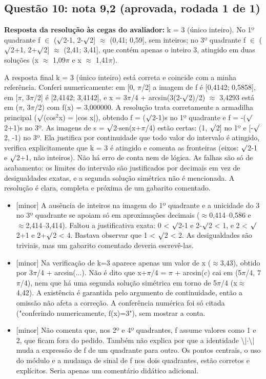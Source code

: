 \documentclass{article}%
\begin{document}
\subsection*{Questão 10: nota 9,2 (aprovada, rodada 1 de 1)}%
\textbf{Resposta da resolução às cegas do avaliador:} k = 3 (único inteiro). No 1º quadrante f $\in$ ($\surd$2-1, 2-$\surd$2{]} $\approx$ (0,41; 0,59{]}, sem inteiros; no 3º quadrante f $\in$ ($\surd$2+1, 2+$\surd$2{]} $\approx$ (2,41; 3,41{]}, que contém apenas o inteiro 3, atingido em duas soluções (x $\approx$ 1,09$\pi$ e x $\approx$ 1,41$\pi$).\par %
A resposta final k = 3 (único inteiro) está correta e coincide com a minha referência. Conferi numericamente: em {[}0, $\pi$/2{]} a imagem de f é {[}0,4142; 0,5858{]}, em {[}$\pi$, 3$\pi$/2{]} é {[}2,4142; 3,4142{]}, e x = 3$\pi$/4 + arcsin(3(2-$\surd$2)/2) $\approx$ 3,4293 está em ($\pi$, 3$\pi$/2) com f(x) = 3,000000. A resolução trata corretamente a armadilha principal ($\surd$(cos$^2$x) = |cos x|), obtendo f = ($\surd$2-1)s no 1º quadrante e f = -($\surd$2+1)s no 3º. As imagens de s = $\surd$2$\cdot$sen(x+$\pi$/4) estão certas: (1, $\surd$2{]} no 1º e {[}-$\surd$2, -1) no 3º. Ela justifica por continuidade que todo valor do intervalo é atingido, verifica explicitamente que k = 3 é atingido e comenta as fronteiras (eixos: $\surd$2-1 e $\surd$2+1, não inteiros). Não há erro de conta nem de lógica. As falhas são só de acabamento: os limites do intervalo são justificados por decimais em vez de desigualdades exatas, e a segunda solução simétrica não é mencionada. A resolução é clara, completa e próxima de um gabarito comentado.%
\begin{itemize}%
\item%
{[}minor{]} A ausência de inteiros na imagem do 1º quadrante e a unicidade do 3 no 3º quadrante se apoiam só em aproximações decimais ($\approx$0,414--0,586 e $\approx$2,414--3,414). Faltou a justificativa exata: 0 < $\surd$2-1 e 2-$\surd$2 < 1, e 2 < $\surd$2+1 e 2+$\surd$2 < 4. Bastava observar que 1 < $\surd$2 < 2. As desigualdades são triviais, mas um gabarito comentado deveria escrevê{-}las.%
\item%
{[}minor{]} Na verificação de k=3 aparece apenas um valor de x ($\approx$3,43), obtido por 3$\pi$/4 + arcsin(...). Não é dito que x+$\pi$/4 = $\pi$ + arcsin(c) cai em (5$\pi$/4, 7$\pi$/4), nem que há uma segunda solução simétrica em torno de 5$\pi$/4 (x$\approx$4,42). A existência é garantida pelo argumento de continuidade, então a omissão não afeta a correção. A conferência numérica foi só citada ("conferindo numericamente, f(x)=3"), sem mostrar a conta.%
\item%
{[}minor{]} Não comenta que, nos 2º e 4º quadrantes, f assume valores como 1 e 2, que ficam fora do pedido. Também não explica por que a identidade \textbackslash{}|$\cdot$\textbackslash{}| muda a expressão de f de um quadrante para outro. Os pontos centrais, o uso do módulo e a mudança de sinal de f nos dois quadrantes, estão corretos e explícitos. Seria apenas um comentário didático adicional.%
\end{itemize}%
\end{document}
